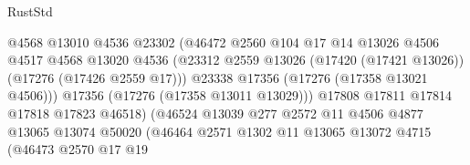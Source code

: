 \begin{lexlean}{RustStd}
\begin{coremodule}
                                          @4568
                                          @13010
                                          @4536
                                          @23302
                                          (@46472
                                            @2560
                                            @104
                                            @17
                                            @14
                                            @13026
                                            @4506
                                            @4517
                                            @4568
                                            @13020
                                            @4536
                                            (@23312
                                              @2559
                                              @13026
                                              (@17420 (@17421 @13026))
                                              (@17276 (@17426 @2559 @17)))
                                            @23338
                                            @17356
                                            (@17276 (@17358 @13021 @4506)))
                                          @17356
                                          (@17276 (@17358 @13011 @13029)))
                                        @17808
                                        @17811
                                        @17814
                                        @17818
                                        @17823
                                        @46518)
                                      (@46524
                                        @13039
                                        @277
                                        @2572
                                        @11
                                        @4506
                                        @4877
                                        @13065
                                        @13074
                                        @50020
                                        (@46464
                                          @2571
                                          @1302
                                          @11
                                          @13065
                                          @13072
                                          @4715
                                          (@46473
                                            @2570
                                            @17
                                            @19

\end{coremodule}
\end{lexlean}

